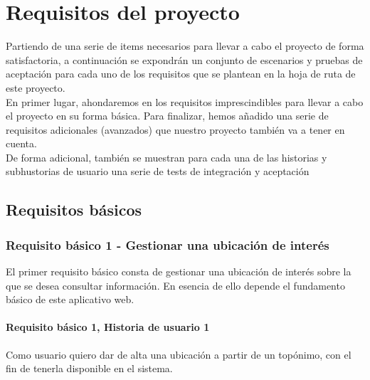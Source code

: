 \documentclass[../ei103948-project-documentation.tex]{subfiles}
\begin{document}
\section{Requisitos del proyecto}
	Partiendo de una serie de items necesarios para llevar a cabo el proyecto de forma satisfactoria, a continuación se expondrán un conjunto de escenarios y pruebas de aceptación para cada uno de los requisitos que se plantean en la hoja de ruta de este proyecto.\\

	En primer lugar, ahondaremos en los requisitos imprescindibles para llevar a cabo el proyecto en su forma básica. Para finalizar, hemos añadido una serie de requisitos adicionales (avanzados) que nuestro proyecto también va a tener en cuenta.\\

	De forma adicional, también se muestran para cada una de las historias y subhustorias de usuario una serie de tests de integración y aceptación


		\subsection{Requisitos básicos}
			\subsubsection{Requisito básico 1 - Gestionar una ubicación de interés}
				El primer requisito básico consta de gestionar una ubicación de interés sobre la que se desea consultar información. En esencia de ello depende el fundamento básico de este aplicativo web.

				\paragraph{Requisito básico 1, Historia de usuario 1}
					Como usuario quiero dar de alta una ubicación a partir de un topónimo, con el fin de tenerla disponible en el sistema.
\end{document}
